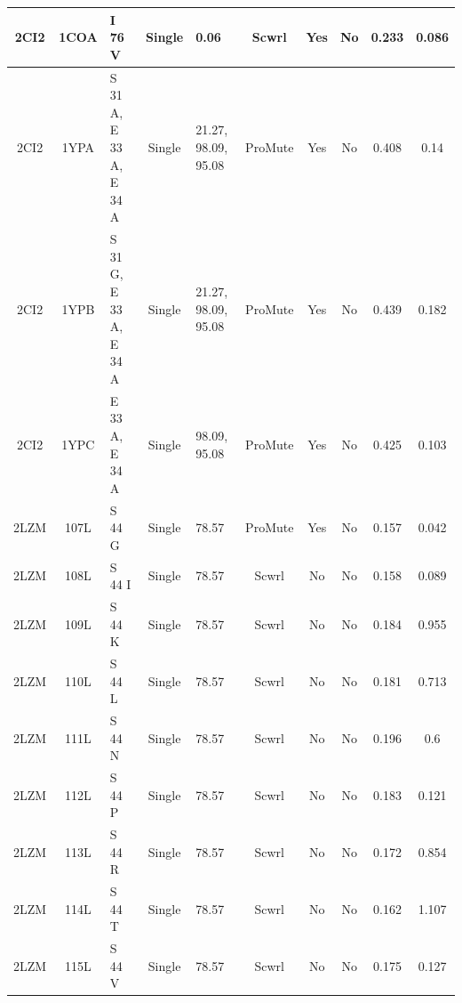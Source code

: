 \documentclass[sigconf]{acmart}
\begin{document}
\begin{table}[]
{\begin{tabular}{|c|c|p{2.8cm}|c|p{2.8cm}|c|c|c|c|c|}
		2CI2 & 1COA & I 76 V & Single & 0.06 & Scwrl & Yes & No & 0.233 & 0.086 \\ \hline
		2CI2 & 1YPA & S 31 A, E 33 A, E 34 A & Single & 21.27, 98.09, 95.08 & ProMute & Yes & No & 0.408 & 0.14 \\ \hline
		2CI2 & 1YPB & S 31 G, E 33 A, E 34 A & Single & 21.27, 98.09, 95.08 & ProMute & Yes & No & 0.439 & 0.182 \\ \hline
		2CI2 & 1YPC & E 33 A, E 34 A & Single & 98.09, 95.08 & ProMute & Yes & No & 0.425 & 0.103 \\ \hline
		2LZM & 107L & S 44 G & Single & 78.57 & ProMute & Yes & No & 0.157 & 0.042 \\ \hline
		2LZM & 108L & S 44 I & Single & 78.57 & Scwrl & No & No & 0.158 & 0.089 \\ \hline
		2LZM & 109L & S 44 K & Single & 78.57 & Scwrl & No & No & 0.184 & 0.955 \\ \hline
		2LZM & 110L & S 44 L & Single & 78.57 & Scwrl & No & No & 0.181 & 0.713 \\ \hline
		2LZM & 111L & S 44 N & Single & 78.57 & Scwrl & No & No & 0.196 & 0.6 \\ \hline
		2LZM & 112L & S 44 P & Single & 78.57 & Scwrl & No & No & 0.183 & 0.121 \\ \hline
		2LZM & 113L & S 44 R & Single & 78.57 & Scwrl & No & No & 0.172 & 0.854 \\ \hline
		2LZM & 114L & S 44 T & Single & 78.57 & Scwrl & No & No & 0.162 & 1.107 \\ \hline
		2LZM & 115L & S 44 V & Single & 78.57 & Scwrl & No & No & 0.175 & 0.127 \\ \hline
	\end{tabular}}
\end{table}
\end{document}
